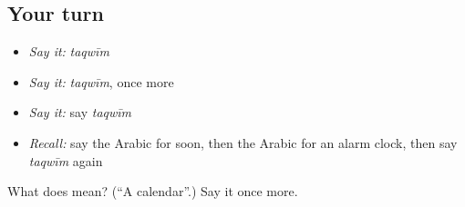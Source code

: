 \subsection*{Your turn}
\begin{itemize}
\raggedright
  \item \emph{Say it:} \emph{taqwīm}
  \item \emph{Say it:} \emph{taqwīm}, once more
  \item \emph{Say it:} say \emph{taqwīm}
  \item \emph{Recall:} say the Arabic for soon, then the Arabic for an alarm clock, then say \emph{taqwīm} again
\end{itemize}

\begin{tcolorbox}[breakable,colback=teal!4,colframe=teal!35!black,title={Before you move on}]
What does  mean? (\textquotedblleft{}A calendar\textquotedblright{}.) Say it once more.
\end{tcolorbox}
